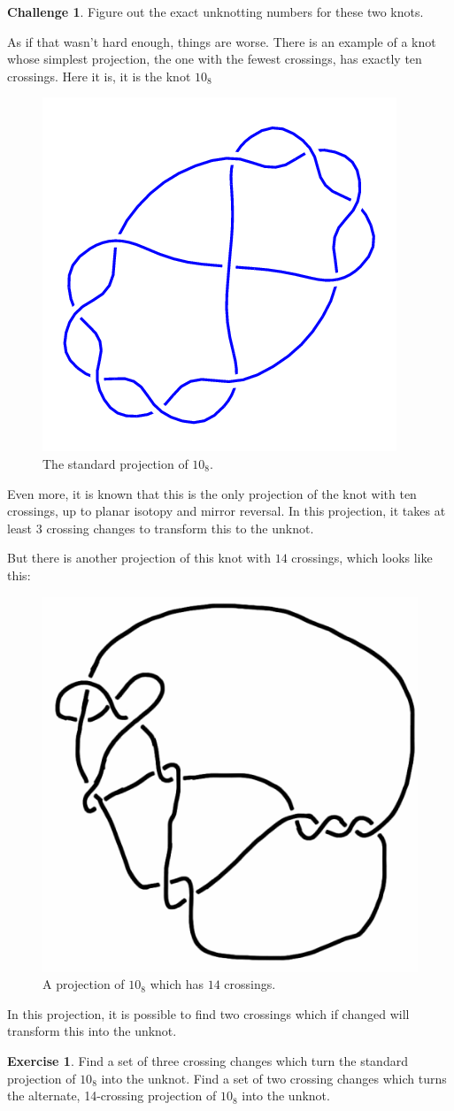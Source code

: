 \documentclass[12pt,letterpaper]{article}
\theoremstyle{definition}
\newtheorem{exercise}[question]{Exercise}
\newtheorem*{challenge}{Challenge}
\begin{document}
\begin{challenge}
Figure out the exact unknotting numbers for these two knots.
\end{challenge}

As if that wasn't hard enough, things are worse.
There is an example of a knot whose simplest projection, the one with the fewest crossings, has exactly ten crossings. 
Here it is, it is the knot $10_8$
\begin{figure}[h!]
    \centering
    \includegraphics[width=.3\textwidth]{knotpics/10_8.png}
    \caption{The standard projection of $10_8$.}
\end{figure}
Even more, it is known that this is the only projection of the knot with ten crossings, up to planar isotopy and mirror reversal.
In this projection, it takes at least $3$ crossing changes to transform this to the unknot.

But there is another projection of this knot with $14$ crossings, which looks like this:
\begin{figure}[h!]
    \centering
    \includegraphics[width=.3\textwidth]{knotpics/10-8-14crossings.png}
    \caption{A projection of $10_8$ which has $14$ crossings.}
\end{figure}

In this projection, it is possible to find two crossings which if changed will transform this into the unknot.

\begin{exercise}
Find a set of three crossing changes which turn the standard projection of $10_8$ into the unknot.
Find a set of two crossing changes which turns the alternate, 14-crossing projection of $10_8$ into the unknot.
\end{exercise}
\end{document}
